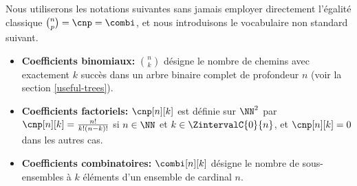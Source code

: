 Nous utiliserons les notations suivantes sans jamais employer directement l'égalité classique $\binom{n}{p} = \cnp = \combi$,
et nous introduisons le vocabulaire non standard suivant.
%
\begin{itemize}
	\item \textbf{Coefficients binomiaux:}
    $\binom{n}{k}$ désigne le nombre de chemins avec exactement $k$ succès dans un arbre binaire complet de profondeur $n$ (voir la section  \ref{useful-trees}).


	\item \textbf{Coefficients factoriels:}
    $\cnp[n][k]$ est définie sur $\NN^2$ par
	$\cnp[n][k] = \frac{n!}{k!(n-k)!}$ si $n \in \NN$ et $k \in \ZintervalC{0}{n}$,
	et
	$\cnp[n][k] = 0$ dans les autres cas.


	\item \textbf{Coefficients combinatoires:}
    $\combi[n][k]$ désigne le nombre de sous-ensembles à $k$ éléments d'un ensemble de cardinal $n$.
\end{itemize}